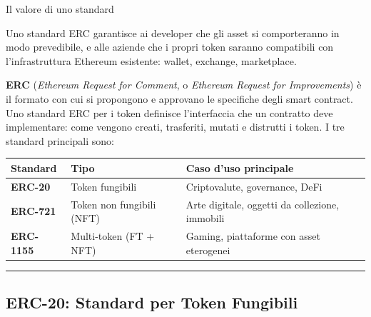 \documentclass[
  italian,
  openany]{book}
\newcounter{none} %
\begin{document}
\begin{callouttip}{Il valore di uno standard}

Uno standard ERC garantisce ai developer che gli asset si comporteranno
in modo prevedibile, e alle aziende che i propri token saranno
compatibili con l'infrastruttura Ethereum esistente: wallet, exchange,
marketplace.

\end{callouttip}

\textbf{ERC} (\emph{Ethereum Request for Comment}, o \emph{Ethereum
Request for Improvements}) è il formato con cui si propongono e
approvano le specifiche degli smart contract. Uno standard ERC per i
token definisce l'interfaccia che un contratto deve implementare: come
vengono creati, trasferiti, mutati e distrutti i token. I tre standard
principali sono:

{\def\LTcaptype{none} %
\begin{longtable}[]{@{}
  >{\raggedright\arraybackslash}p{}
  >{\raggedright\arraybackslash}p{}
  >{\raggedright\arraybackslash}p{}@{}}
\toprule\noalign{}
\begin{minipage}[b]{\linewidth}\raggedright
Standard
\end{minipage} & \begin{minipage}[b]{\linewidth}\raggedright
Tipo
\end{minipage} & \begin{minipage}[b]{\linewidth}\raggedright
Caso d'uso principale
\end{minipage} \\
\midrule\noalign{}
\endhead
\bottomrule\noalign{}
\endlastfoot
\textbf{ERC-20} & Token fungibili & Criptovalute, governance, DeFi \\
\textbf{ERC-721} & Token non fungibili (NFT) & Arte digitale, oggetti da
collezione, immobili \\
\textbf{ERC-1155} & Multi-token (FT + NFT) & Gaming, piattaforme con
asset eterogenei \\
\end{longtable}
}

\begin{center}\rule{0.5\linewidth}{0.5pt}\end{center}

\subsection{ERC-20: Standard per Token
Fungibili}\label{erc-20-standard-per-token-fungibili}
\end{document}
